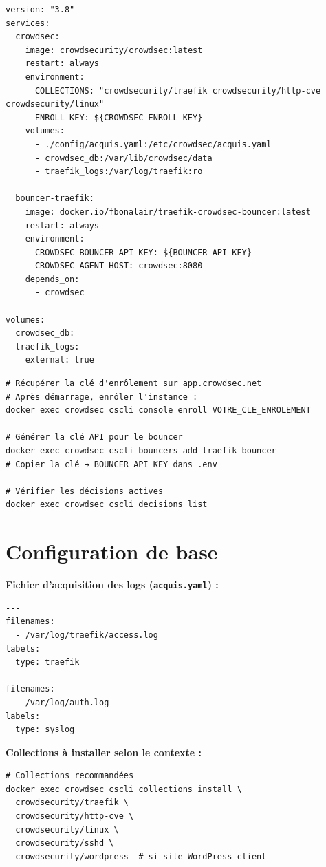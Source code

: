 \documentclass[11pt, a4paper]{article}
\begin{document}
\begin{lstlisting}[style=yamlstyle, caption={docker-compose.yml — CrowdSec + Bouncer Traefik}]
version: "3.8"
services:
  crowdsec:
    image: crowdsecurity/crowdsec:latest
    restart: always
    environment:
      COLLECTIONS: "crowdsecurity/traefik crowdsecurity/http-cve crowdsecurity/linux"
      ENROLL_KEY: ${CROWDSEC_ENROLL_KEY}
    volumes:
      - ./config/acquis.yaml:/etc/crowdsec/acquis.yaml
      - crowdsec_db:/var/lib/crowdsec/data
      - traefik_logs:/var/log/traefik:ro

  bouncer-traefik:
    image: docker.io/fbonalair/traefik-crowdsec-bouncer:latest
    restart: always
    environment:
      CROWDSEC_BOUNCER_API_KEY: ${BOUNCER_API_KEY}
      CROWDSEC_AGENT_HOST: crowdsec:8080
    depends_on:
      - crowdsec

volumes:
  crowdsec_db:
  traefik_logs:
    external: true
\end{lstlisting}

\begin{lstlisting}[style=terminal, caption={Initialisation et enrôlement dans la console cloud}]
# Récupérer la clé d'enrôlement sur app.crowdsec.net
# Après démarrage, enrôler l'instance :
docker exec crowdsec cscli console enroll VOTRE_CLE_ENROLEMENT

# Générer la clé API pour le bouncer
docker exec crowdsec cscli bouncers add traefik-bouncer
# Copier la clé → BOUNCER_API_KEY dans .env

# Vérifier les décisions actives
docker exec crowdsec cscli decisions list
\end{lstlisting}

\section{Configuration de base}

\textbf{Fichier d'acquisition des logs (\texttt{acquis.yaml}) :}
\begin{lstlisting}[style=yamlstyle]
---
filenames:
  - /var/log/traefik/access.log
labels:
  type: traefik
---
filenames:
  - /var/log/auth.log
labels:
  type: syslog
\end{lstlisting}

\textbf{Collections à installer selon le contexte :}
\begin{lstlisting}[style=terminal]
# Collections recommandées
docker exec crowdsec cscli collections install \
  crowdsecurity/traefik \
  crowdsecurity/http-cve \
  crowdsecurity/linux \
  crowdsecurity/sshd \
  crowdsecurity/wordpress  # si site WordPress client
\end{lstlisting}
\end{document}
